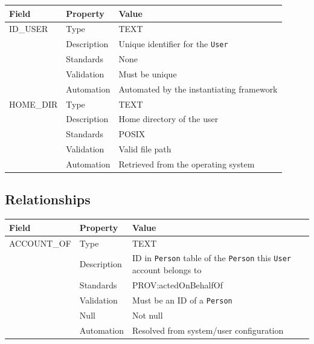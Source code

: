 \documentclass[
]{article}
\newcounter{none} %
\begin{document}
{\def\LTcaptype{none} %
\begin{longtable}[]{@{}lll@{}}
\toprule\noalign{}
Field & Property & Value \\
\midrule\noalign{}
\endhead
\bottomrule\noalign{}
\endlastfoot
ID\_USER & Type & TEXT \\
& Description & Unique identifier for the \texttt{User} \\
& Standards & None \\
& Validation & Must be unique \\
& Automation & Automated by the instantiating framework \\
HOME\_DIR & Type & TEXT \\
& Description & Home directory of the user \\
& Standards & POSIX \\
& Validation & Valid file path \\
& Automation & Retrieved from the operating system \\
\end{longtable}
}

\subsection{Relationships}\label{relationships-30}

{\def\LTcaptype{none} %
\begin{longtable}[]{@{}
  >{\raggedright\arraybackslash}p{}
  >{\raggedright\arraybackslash}p{}
  >{\raggedright\arraybackslash}p{}@{}}
\toprule\noalign{}
\begin{minipage}[b]{\linewidth}\raggedright
Field
\end{minipage} & \begin{minipage}[b]{\linewidth}\raggedright
Property
\end{minipage} & \begin{minipage}[b]{\linewidth}\raggedright
Value
\end{minipage} \\
\midrule\noalign{}
\endhead
\bottomrule\noalign{}
\endlastfoot
ACCOUNT\_OF & Type & TEXT \\
& Description & ID in \texttt{Person} table of the \texttt{Person} this
\texttt{User} account belongs to \\
& Standards & PROV:actedOnBehalfOf \\
& Validation & Must be an ID of a \texttt{Person} \\
& Null & Not null \\
& Automation & Resolved from system/user configuration \\
\end{longtable}
}
\end{document}
